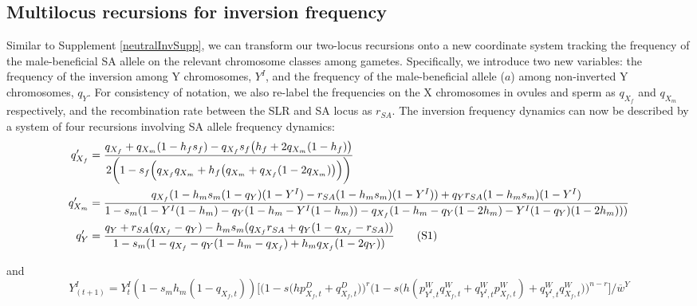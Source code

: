 \documentclass{article}
\newcommand\numberthis{\addtocounter{equation}{1}\tag{\theequation}}
\begin{document}
\begin{appendices}
\subsection{Multilocus recursions for inversion frequency} \label{subsec:multilocYI-SA}

Similar to Supplement \ref{neutralInvSupp}, we can transform our two-locus recursions onto a new coordinate system tracking the frequency of the male-beneficial SA allele on the relevant chromosome classes among gametes. Specifically, we introduce two new variables: the frequency of the inversion among Y chromosomes, $Y^I$, and the frequency of the male-beneficial allele ($a$) among non-inverted Y chromosomes, $q_Y$. For consistency of notation, we also re-label the frequencies on the X chromosomes in ovules and sperm as $q_{X_f}$ and $q_{X_m}$ respectively, and the recombination rate between the SLR and SA locus as $r_{SA}$. The inversion frequency dynamics can now be described by a system of four recursions involving SA allele frequency dynamics:
\begin{align*}
	q^{\prime}_{X_f}       &= \frac{q_{X_f} + q_{X_m} (1 - h_f s_f) - q_{X_f} s_f \big(h_f + 2  q_{X_m} (1 - h_f)\big)}{2 \bigg(1 - s_f \Big(q_{X_f} q_{X_m} + h_f \big(q_{X_m} + q_{X_f} (1 - 2 q_{X_m})\big)\Big)\bigg)} \\
	q^{\prime}_{X_m}      &= \frac{q_{X_f} (1 - h_m s_m (1 - q_Y) (1 - Y^I) - r_{SA} (1 - h_m s_m) (1 - Y^I)) + q_Y r_{SA} (1 - h_m s_m) (1 - Y^I)}{1 - s_m (1 - Y^I (1 - h_m) - q_Y (1 - h_m - Y^I (1 - h_m)) - 
    q_{X_f} (1 - h_m - q_Y (1 - 2 h_m) - Y^I (1 - q_Y) (1 - 2 h_m)))}  \\
	q^{\prime}_{Y}       &= \frac{q_Y + r_{SA} (q_{X_f} - q_Y) - h_m s_m (q_{X_f} r_{SA} + q_Y (1 - q_{X_f} - r_{SA}))}{1 - s_m (1 - q_{X_f} - q_Y (1 - h_m - q_{X_f}) + h_m q_{X_f} (1 - 2 q_Y))} \numberthis
\end{align*}

\noindent and 
\begin{equation} \label{eq:YIprime-SA-multiLoc}
	Y^I_{(t + 1)} = Y^I_t (1 - s_m h_m (1 - q_{X_f,t})) \Bigg[ \Big(1 - s \big(h p^{D}_{X_f,t} + q^{D}_{X_f,t} \big) \Big)^{r}\Big(1 - s \big(h (p^{W}_{Y^I,t} q^{W}_{X_f,t} + q^{W}_{Y^I,t} p^{W}_{X_f,t}) + q^{W}_{Y^I,t} q^{W}_{X_f,t} \big) \Big)^{n-r} \Bigg] \Bigg/ \overline{w}^Y
\end{equation}


\end{appendices}
\end{document}
